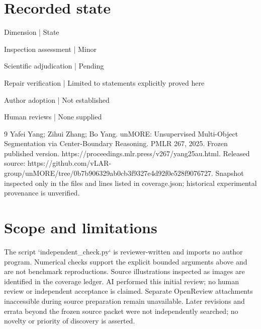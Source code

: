 \documentclass[10pt]{article}
\begin{document}
\section*{Recorded state}
Dimension | State\par
Inspection assessment | Minor\par
Scientific adjudication | Pending\par
Repair verification | Limited to statements explicitly proved here\par
Author adoption | Not established\par
Human reviews | None supplied\par
9 Yafei Yang; Zihui Zhang; Bo Yang. unMORE: Unsupervised Multi-Object Segmentation via Center-Boundary Reasoning. PMLR 267, 2025. Frozen published version. https://proceedings.mlr.press/v267/yang25au.html. Released source: https://github.com/vLAR-group/unMORE/tree/0b7b906329ab0cb3f9327e4d92f0e528f9076727. Snapshot inspected only in the files and lines listed in coverage.json; historical experimental provenance is unverified.\par
\section*{Scope and limitations}
The script `independent\_check.py` is reviewer-written and imports no author program. Numerical checks support the explicit bounded arguments above and are not benchmark reproductions. Source illustrations inspected as images are identified in the coverage ledger. AI performed this initial review; no human review or independent acceptance is claimed. Separate OpenReview attachments inaccessible during source preparation remain unavailable. Later revisions and errata beyond the frozen source packet were not independently searched; no novelty or priority of discovery is asserted.\par
\end{document}
